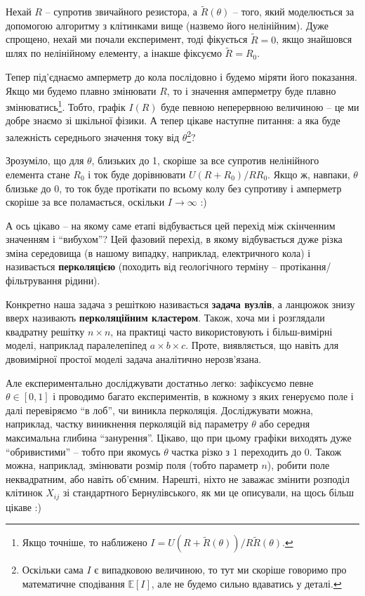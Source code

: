 \documentclass[oneside,solution]{tmpl}
\begin{document}
Нехай $R$ -- супротив звичайного резистора, а $\widetilde{R}(\theta)$ -- того, який моделюється за допомогою алгоритму з клітинками вище (назвемо його нелінійним). Дуже спрощено, нехай ми почали експеримент, тоді фікується $\widetilde{R} = 0$, якщо знайшовся шлях по нелінійному елементу, а інакше фіксуємо $\widetilde{R} = R_0$. 

Тепер під'єднаємо амперметр до кола послідовно і будемо міряти його показання. Якщо ми будемо плавно змінювати $R$, то і значення амперметру буде плавно змінюватись\footnote{Якщо точніше, то наближено $I = U(R+\widetilde{R}(\theta))/R\widetilde{R}(\theta)$.}. Тобто, графік $I(R)$ буде певною неперервною величиною -- це ми добре знаємо зі шкільної фізики. А тепер цікаве наступне питання: а яка буде залежність середнього значення току від $\theta$\footnote{Оскільки сама $I$ є випадковою величиною, то тут ми скоріше говоримо про математичне сподівання $\mathbb{E}[I]$, але не будемо сильно вдаватись у деталі.}?

Зрозуміло, що для $\theta$, близьких до 1, скоріше за все супротив нелінійного елемента стане $R_0$ і ток буде дорівнювати $U(R+R_0)/RR_0$. Якщо ж, навпаки, $\theta$ близьке до $0$, то ток буде протікати по всьому колу без супротиву і амперметр скоріше за все поламається, оскільки $I \to \infty$ :) 

А ось цікаво -- на якому саме етапі відбувається цей перехід між скінченним значенням і ``вибухом''? Цей фазовий перехід, в якому відбувається дуже різка зміна середовища (в нашому випадку, наприклад, електричного кола) і називається \textbf{перколяцією} (походить від геологічного терміну -- протікання/фільтрування рідини). 

Конкретно наша задача з решіткою називається \textbf{задача вузлів}, а ланцюжок знизу вверх називають \textbf{перколяційним кластером}. Також, хоча ми і розглядали квадратну решітку $n \times n$, на практиці часто використовують і більш-вимірні моделі, наприклад паралелепіпед $a \times b \times c$. Проте, виявляється, що навіть для двовимірної простої моделі задача аналітично нерозв'язана.

Але експериментально досліджувати достатньо легко: зафіксуємо певне $\theta \in [0,1]$ і проводимо багато експериментів, в кожному з яких генеруємо поле і далі перевіряємо ``в лоб'', чи виникла перколяція. Досліджувати можна, наприклад, частку виникнення перколяцій від параметру $\theta$ або середня максимальна глибина ``занурення''. Цікаво, що при цьому графіки виходять дуже ``обривистими'' -- тобто при якомусь $\theta$ частка різко з $1$ переходить до $0$. Також можна, наприклад, змінювати розмір поля (тобто параметр $n$), робити поле неквадратним, або навіть об'ємним. Нарешті, ніхто не заважає змінити розподіл клітинок $X_{ij}$ зі стандартного Бернулівського, як ми це описували, на щось більш цікаве :)
\end{document}
